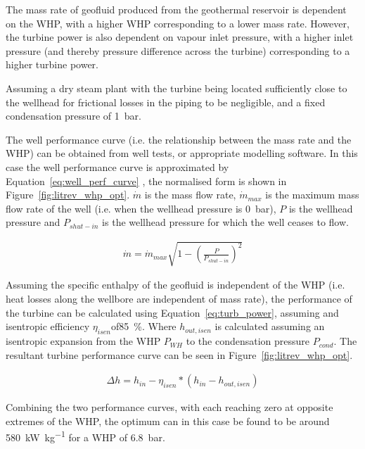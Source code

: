             The mass rate of geofluid produced from the geothermal reservoir is dependent on the \ac{WHP}, with a higher \ac{WHP} corresponding to a lower mass rate. However, the turbine power is also dependent on vapour inlet pressure, with a higher inlet pressure (and thereby pressure difference across the turbine) corresponding to a higher turbine power.

            Assuming a dry steam plant with the turbine being located sufficiently close to the wellhead for frictional losses in the piping to be negligible, and a fixed condensation pressure of \qty{1}{\bar}.

            The well performance curve (i.e. the relationship between the mass rate and the \ac{WHP}) can be obtained from well tests, or appropriate modelling software. In this case the well performance curve is approximated by Equation~\ref{eq:well_perf_curve} \cite{DiPippo2016}, the normalised form is shown in Figure~\ref{fig:litrev_whp_opt}. \(\Dot{m}\) is the mass flow rate, \(\Dot{m}_{max}\) is the maximum mass flow rate of the well (i.e. when the wellhead pressure is \qty{0}{\bar}), \(P\) is the wellhead pressure and \(P_{shut-in}\) is the wellhead pressure for which the well ceases to flow.

            \begin{align}
                \Dot{m} = \Dot{m}_{max}\sqrt{1-\left(\frac{P}{P_{shut-in}}\right)^2} \label{eq:well_perf_curve}
            \end{align}
    
            Assuming the specific enthalpy of the geofluid is independent of the \ac{WHP} (i.e. heat losses along the wellbore are independent of mass rate), the performance of the turbine can be calculated using Equation~\ref{eq:turb_power}, assuming and isentropic efficiency \(\eta_{isen}\)of\qty{85}{\percent}. Where \(h_{out, isen}\) is calculated assuming an isentropic expansion from the \ac{WHP} \(P_{WH}\) to the condensation pressure \(P_{cond}\). The resultant turbine performance curve can be seen in Figure~\ref{fig:litrev_whp_opt}.
    
            \begin{align}
                \Delta h = h_{in} - \eta_{isen}*(h_{in}-h_{out, isen}) \label{eq:turb_power}
            \end{align}
    
            Combining the two performance curves, with each reaching zero at opposite extremes of the \ac{WHP}, the optimum can in this case be found to be around \qty{580}{\kilo\watt\per\kg} for a \ac{WHP} of \qty{6.8}{\bar}.
    
